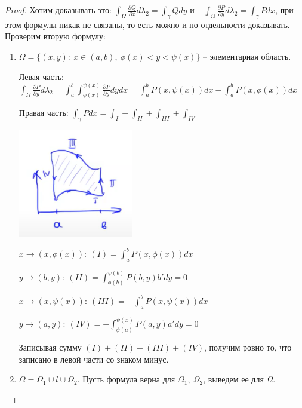 \begin{proof}
    Хотим доказывать это: $\int_{\Omega} { \frac{\partial Q}{\partial x} d \lambda_2 } = \int_{\gamma} {Q dy}$ и $-\int_{\Omega} {\frac{\partial P}{\partial y} d \lambda_2} = \int_{\gamma} {P dx}$, при этом формулы никак не связаны, то есть можно и по-отдельности доказывать. Проверим вторую формулу:

    \begin{enumerate}
        \item {
            $\Omega = \{ (x, y): \ x \in (a, b), \ \phi(x) < y < \psi(x) \}$ -- элементарная область.

            Левая часть: $\int_{\Omega} {\frac{\partial P}{\partial y} d \lambda_2} = \int_{a}^{b} { \int_{\phi(x)}^{\psi(x)} { \frac{\partial P}{\partial y} dy } dx } = \int_{a}^{b} { P(x, \psi(x)) dx } - \int_{a}^{b} { P(x, \phi(x)) dx }$

            
            Правая часть: $\int_{\gamma} { P dx } = \int_{I} + \int_{II} + \int_{III} + \int_{IV}$
            \begin{center}
                \includegraphics[width=5cm]{assets/03-intergrals-with-params/green-formula-proof-1.png}
            \end{center}

            $x\rightarrow (x, \phi(x)): \ (I) = \int_{a}^{b} { P(x, \phi(x)) dx}$

            $y \rightarrow (b, y): \ (II) = \int_{\phi(b)}^{\psi(b)} { P(b, y) b' dy } = 0$

            $x \rightarrow (x, \psi(x)): \ (III) = -\int_{a}^{b} { P(x, \psi(x)) dx}$

            $y \rightarrow (a, y): \ (IV) = - \int_{\phi(a)}^{\psi(x)} { P(a, y) a' dy } = 0$

            Записывая сумму $(I) + (II) + (III) + (IV)$, получим ровно то, что записано в левой части со знаком минус.
        }
        \item {
            $\Omega = \Omega_1 \cup l \cup \Omega_2$. Пусть формула верна для $\Omega_1, \ \Omega_2$, выведем ее для $\Omega$.
            
}
\end{enumerate}
\end{proof}
